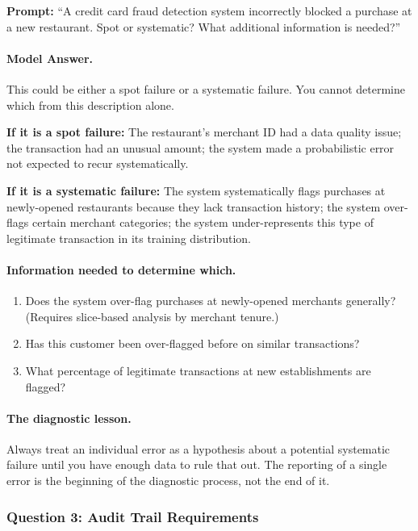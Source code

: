 \textbf{Prompt:} ``A credit card fraud detection system incorrectly blocked a purchase at a new restaurant. Spot or systematic? What additional information is needed?''

\paragraph{Model Answer.}

This could be either a spot failure or a systematic failure. You cannot determine which from this description alone.

\textbf{If it is a spot failure:} The restaurant's merchant ID had a data quality issue; the transaction had an unusual amount; the system made a probabilistic error not expected to recur systematically.

\textbf{If it is a systematic failure:} The system systematically flags purchases at newly-opened restaurants because they lack transaction history; the system over-flags certain merchant categories; the system under-represents this type of legitimate transaction in its training distribution.

\paragraph{Information needed to determine which.}

\begin{enumerate}
    \item Does the system over-flag purchases at newly-opened merchants generally? (Requires slice-based analysis by merchant tenure.)
    \item Has this customer been over-flagged before on similar transactions?
    \item What percentage of legitimate transactions at new establishments are flagged?
\end{enumerate}

\paragraph{The diagnostic lesson.}

Always treat an individual error as a hypothesis about a potential systematic failure until you have enough data to rule that out. The reporting of a single error is the beginning of the diagnostic process, not the end of it.

\subsubsection{Question 3: Audit Trail Requirements}

